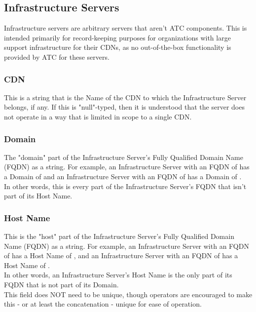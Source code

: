 %
%
\subsection{Infrastructure Servers}
Infrastructure servers are arbitrary servers that aren't ATC components. This
is intended primarily for record-keeping purposes for organizations with large
support infrastructure for their CDNs, as no out-of-the-box functionality is
provided by ATC for these servers.

\subsubsection{CDN}
This is a string that is the Name of the CDN to which the Infrastructure Server
belongs, if any. If this is "null"-typed, then it is understood that the server
does not operate in a way that is limited in scope to a single CDN.

\subsubsection{Domain}
The "domain" part of the Infrastructure Server's Fully Qualified Domain Name
(FQDN) as a string. For example, an Infrastructure Server with an FQDN of
 has a Domain of  and an Infrastructure Server with
an FQDN of  has a Domain of
.\\
In other words, this is every part of the Infrastructure Server's FQDN that
isn't part of its Host Name.

\subsubsection{Host Name}
This is the "host" part of the Infrastructure Server's Fully Qualified Domain
Name (FQDN) as a string. For example, an Infrastructure Server with an FQDN of
 has a Host Name of , and an Infrastructure
Server with an FQDN of  has a Host Name of
.\\
In other words, an Infrastructure Server's Host Name is the only part of its
FQDN that is not part of its Domain.\\
This field does NOT need to be unique, though operators are encouraged to make
this - or at least the concatenation  -
unique for ease of operation.


